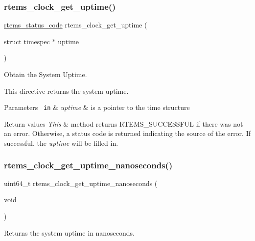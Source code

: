 \subsubsection{\texorpdfstring{rtems\_clock\_get\_uptime()}{rtems\_clock\_get\_uptime()}}
{\footnotesize\ttfamily \mbox{\hyperlink{group__ClassicStatus_ga545d41846817eaba6143d52ee4d9e9fe}{rtems\+\_\+status\+\_\+code}} rtems\+\_\+clock\+\_\+get\+\_\+uptime (\begin{DoxyParamCaption}\item[{struct timespec $\ast$}]{uptime }\end{DoxyParamCaption})}



Obtain the System Uptime. 

This directive returns the system uptime.


\begin{DoxyParams}[1]{Parameters}
\mbox{\texttt{ in}}  & {\em uptime} & is a pointer to the time structure\\
\hline
\end{DoxyParams}

\begin{DoxyRetVals}{Return values}
{\em This} & method returns R\+T\+E\+M\+S\+\_\+\+S\+U\+C\+C\+E\+S\+S\+F\+UL if there was not an error. Otherwise, a status code is returned indicating the source of the error. If successful, the {\itshape uptime} will be filled in. \\
\hline
\end{DoxyRetVals}
\mbox{\label{group__ClassicClock_ga0e2b9de0054d75a0820203f00e152aa7}} 
\subsubsection{\texorpdfstring{rtems\_clock\_get\_uptime\_nanoseconds()}{rtems\_clock\_get\_uptime\_nanoseconds()}}
{\footnotesize\ttfamily uint64\+\_\+t rtems\+\_\+clock\+\_\+get\+\_\+uptime\+\_\+nanoseconds (\begin{DoxyParamCaption}\item[{void}]{ }\end{DoxyParamCaption})}



Returns the system uptime in nanoseconds. 


